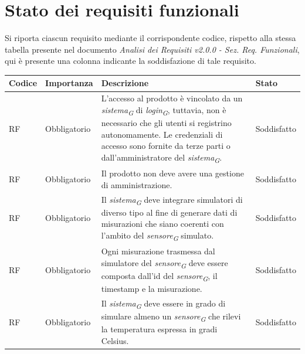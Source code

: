 \section{Stato dei requisiti funzionali}

Si riporta ciascun requisito mediante il corrispondente codice,
rispetto alla stessa tabella presente nel documento \textit{Analisi dei Requisiti v2.0.0 - Sez. Req. Funzionali}, qui è presente
una colonna indicante la soddisfazione di tale requisito.

\setcounter{rowcounter}{0}

\begin{longtable}{|C{1.5cm}|C{2cm}|L{5cm}|C{2cm}|}
    \hline
    \textbf{Codice} & \textbf{Importanza} & \textbf{Descrizione} & \textbf{Stato} \\
    
    \hline
    RF & Obbligatorio &
    L'accesso al prodotto è vincolato da un \textit{sistema}\textsubscript{\textit{G}} di \textit{login}\textsubscript{\textit{G}}, tuttavia, non è necessario che gli utenti si registrino autonomamente. Le credenziali di accesso sono fornite da terze parti o dall'amministratore del \textit{sistema}\textsubscript{\textit{G}}.& Soddisfatto \\
    
    \hline
     RF & Obbligatorio & Il prodotto non deve avere una gestione di amministrazione. & Soddisfatto \\
    
    \hline
     RF & Obbligatorio & Il \textit{sistema}\textsubscript{\textit{G}} deve integrare simulatori di diverso tipo al fine di generare dati di misurazioni che siano coerenti con l'ambito del \textit{sensore}\textsubscript{\textit{G}} simulato. & Soddisfatto \\
    
    \hline
     RF & Obbligatorio & Ogni misurazione trasmessa dal simulatore del \textit{sensore}\textsubscript{\textit{G}} deve essere composta dall'id del \textit{sensore}\textsubscript{\textit{G}}, il timestamp e la misurazione. & Soddisfatto\\
    
    \hline
     RF & Obbligatorio &  Il \textit{sistema}\textsubscript{\textit{G}} deve essere in grado di simulare almeno un \textit{sensore}\textsubscript{\textit{G}} che rilevi la temperatura espressa in gradi Celsius.& Soddisfatto \\
    

\end{longtable}
